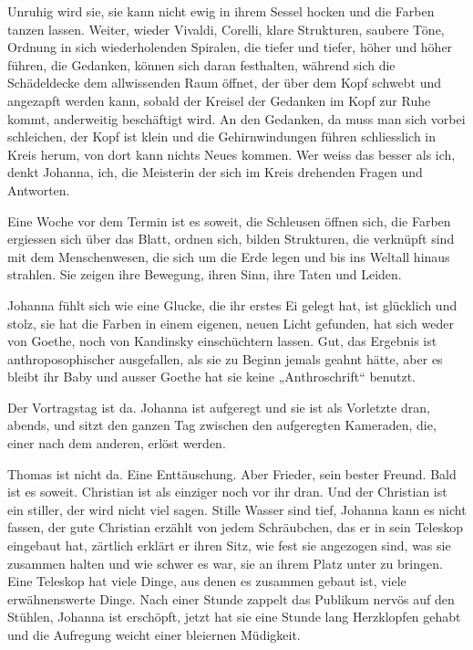 \documentclass[10pt,titlepage,a5paper]{book}
\begin{document}
Unruhig wird sie, sie kann nicht ewig in ihrem Sessel hocken und die Farben tanzen lassen. Weiter, wieder Vivaldi, Corelli, klare Strukturen, saubere Töne, Ordnung in sich wiederholenden Spiralen, die tiefer und tiefer, höher und höher führen, die Gedanken, können sich daran festhalten, während sich die Schädeldecke dem allwissenden Raum öffnet, der über dem Kopf schwebt und angezapft werden kann, sobald der Kreisel der Gedanken im Kopf zur Ruhe kommt, anderweitig beschäftigt wird. An den Gedanken, da muss man sich vorbei schleichen, der Kopf ist klein und die Gehirnwindungen führen schliesslich in Kreis herum, von dort kann nichts Neues kommen. Wer weiss das besser als ich, denkt Johanna, ich, die Meisterin der sich im Kreis drehenden Fragen und Antworten.

Eine Woche vor dem Termin ist es soweit, die Schleusen öffnen sich, die Farben ergiessen sich über das Blatt, ordnen sich, bilden Strukturen, die verknüpft sind mit dem Menschenwesen, die sich um die Erde legen und bis ins Weltall hinaus strahlen. Sie zeigen ihre Bewegung, ihren Sinn, ihre Taten und Leiden.

Johanna fühlt sich wie eine Glucke, die ihr erstes Ei gelegt hat, ist glücklich und stolz, sie hat die Farben in einem eigenen, neuen Licht gefunden, hat sich weder von Goethe, noch von Kandinsky einschüchtern lassen. Gut, das Ergebnis ist anthroposophischer ausgefallen, als sie zu Beginn jemals geahnt hätte, aber es bleibt ihr Baby und ausser Goethe hat sie keine „Anthroschrift“ benutzt.

Der Vortragstag ist da. Johanna ist aufgeregt und sie ist als Vorletzte dran, abends, und sitzt den ganzen Tag zwischen den aufgeregten Kameraden, die, einer nach dem anderen, erlöst werden.

Thomas ist nicht da. Eine Enttäuschung. Aber Frieder, sein bester Freund.
Bald ist es soweit. Christian ist als einziger noch vor ihr dran. Und der Christian ist ein stiller, der wird nicht viel sagen. Stille Wasser sind tief, Johanna kann es nicht fassen, der gute Christian erzählt von jedem Schräubchen, das er in sein Teleskop eingebaut hat, zärtlich erklärt er ihren Sitz, wie fest sie angezogen sind, was sie zusammen halten und wie schwer es war, sie an ihrem Platz unter zu bringen. Eine Teleskop hat viele Dinge, aus denen es zusammen gebaut ist, viele erwähnenswerte Dinge. Nach einer Stunde zappelt das Publikum nervös auf den Stühlen, Johanna ist erschöpft, jetzt hat sie eine Stunde lang Herzklopfen gehabt und die Aufregung weicht einer bleiernen Müdigkeit. 
\end{document}
